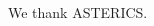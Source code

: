 \documentclass[a0,portrait]{a0poster}
\begin{document}
\begin{multicols}{2}
\cite{*}


\vspace{10mm}

{\footnotesize 
  We thank ASTERICS.}




\end{multicols}
\end{document}
